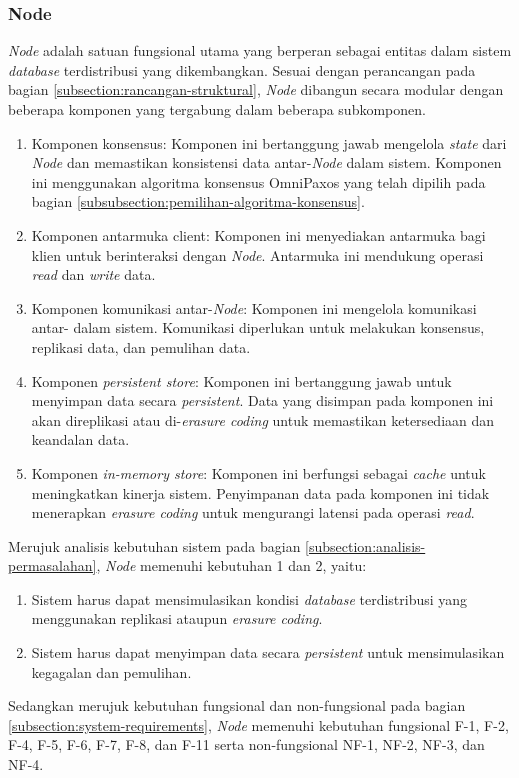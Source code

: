 \subsubsection{Node}
\label{subsubsection:node}

\textit{Node} adalah satuan fungsional utama yang berperan sebagai entitas dalam sistem \textit{database} terdistribusi yang dikembangkan. Sesuai dengan perancangan pada bagian \ref{subsection:rancangan-struktural}, \textit{Node} dibangun secara modular dengan beberapa komponen yang tergabung dalam beberapa subkomponen.

\begin{enumerate}
    \item Komponen konsensus: Komponen ini bertanggung jawab mengelola \textit{state} dari \textit{Node} dan memastikan konsistensi data antar-\textit{Node} dalam sistem. Komponen ini menggunakan algoritma konsensus OmniPaxos yang telah dipilih pada bagian \ref{subsubsection:pemilihan-algoritma-konsensus}.
    \item Komponen antarmuka client: Komponen ini menyediakan antarmuka bagi klien untuk berinteraksi dengan \textit{Node}. Antarmuka ini mendukung operasi \textit{read} dan \textit{write} data.
    \item Komponen komunikasi antar-\textit{Node}: Komponen ini mengelola komunikasi antar- dalam sistem. Komunikasi diperlukan untuk melakukan konsensus, replikasi data, dan pemulihan data.
    \item Komponen \textit{persistent store}: Komponen ini bertanggung jawab untuk menyimpan data secara \textit{persistent}. Data yang disimpan pada komponen ini akan direplikasi atau di-\textit{erasure coding} untuk memastikan ketersediaan dan keandalan data.
    \item Komponen \textit{in-memory store}: Komponen ini berfungsi sebagai \textit{cache} untuk meningkatkan kinerja sistem. Penyimpanan data pada komponen ini tidak menerapkan \textit{erasure coding} untuk mengurangi latensi pada operasi \textit{read}.
\end{enumerate}

Merujuk analisis kebutuhan sistem pada bagian \ref{subsection:analisis-permasalahan}, \textit{Node} memenuhi kebutuhan 1 dan 2, yaitu:

\begin{enumerate}
    \item Sistem harus dapat mensimulasikan kondisi \textit{database} terdistribusi yang menggunakan replikasi ataupun \textit{erasure coding}.
    \item Sistem harus dapat menyimpan data secara \textit{persistent} untuk mensimulasikan kegagalan dan pemulihan.
\end{enumerate}

Sedangkan merujuk kebutuhan fungsional dan non-fungsional pada bagian \ref{subsection:system-requirements}, \textit{Node} memenuhi kebutuhan fungsional F-1, F-2, F-4, F-5, F-6, F-7, F-8, dan F-11 serta non-fungsional NF-1, NF-2, NF-3, dan NF-4.
